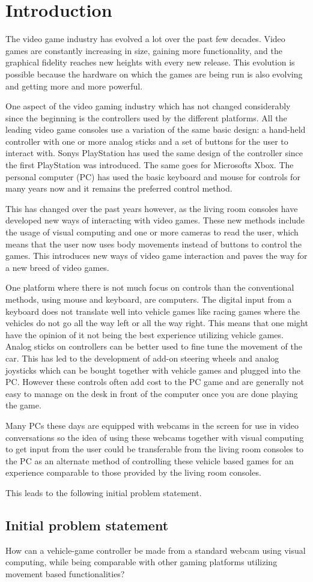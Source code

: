 \section{Introduction}
The video game industry has evolved a lot over the past few decades. Video games are constantly increasing in size, gaining more functionality, and the graphical fidelity reaches new heights with every new release. This evolution is possible because the hardware on which the games are being run is also evolving and getting more and more powerful.
\bigskip

One aspect of the video gaming industry which has not changed considerably since the beginning is the controllers used by the different platforms. All the leading video game consoles use a variation of the same basic design: a hand-held controller with one or more analog sticks and a set of buttons for the user to interact with. Sonys PlayStation has used the same design of the controller since the first PlayStation was introduced. The same goes for Microsofts Xbox. The personal computer (PC) has used the basic keyboard and mouse for controls for many years now and it remains the preferred control method.
\bigskip

This has changed over the past years however, as the living room consoles have developed new ways of interacting with video games. These new methods include the usage of visual computing and one or more cameras to read the user, which means that the user now uses body movements instead of buttons to control the games. This introduces new ways of video game interaction and paves the way for a new breed of video games.
\bigskip

One platform where there is not much focus on controls than the conventional methods, using mouse and keyboard, are computers. The digital input from a keyboard does not translate well into vehicle games like racing games where the vehicles do not go all the way left or all the way right. This means that one might have the opinion of it not being the best experience utilizing vehicle games. Analog sticks on controllers can be better used to fine tune the movement of the car. This has led to the development of add-on steering wheels and analog joysticks which can be bought together with vehicle games and plugged into the PC. However these controls often add cost to the PC game and are generally not easy to manage on the desk in front of the computer once you are done playing the game.
\bigskip

Many PCs these days are equipped with webcams in the screen for use in video conversations so the idea of using these webcams together with visual computing to get input from the user could be transferable from the living room consoles to the PC as an alternate method of controlling these vehicle based games for an experience comparable to those provided by the living room consoles.

\noindent This leads to the following initial problem statement.

\subsection{Initial problem statement}
How can a vehicle-game controller be made from a standard webcam using visual computing, while being comparable with other gaming platforms utilizing movement based functionalities?